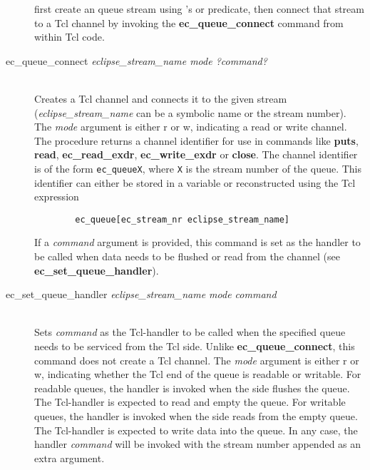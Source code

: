 \begin{description}
first create an {\eclipse} queue stream using {\eclipse}'s
or
predicate, then connect that stream to a Tcl channel by invoking
the {\bf ec_queue_connect} command from within Tcl code.

\item[\index{ec_queue_connect (Tcl embedding interface)}ec_queue_connect {\it eclipse_stream_name mode ?command?}]\ \\
        Creates a Tcl channel and connects it to the given {\eclipse}
        stream ({\it eclipse_stream_name} can be a symbolic name or the
        {\eclipse} stream number).
        The {\it mode} argument is either r or w, indicating a read or write channel.
        The procedure returns a channel identifier for use in commands
        like {\bf puts}, {\bf read}, {\bf ec_read_exdr},
        {\bf ec_write_exdr} or {\bf close}.
        The channel identifier is of the form {\tt ec_queueX}, where {\tt X}
        is the {\eclipse} stream number of the queue.
        This identifier can either be stored in a variable or reconstructed
        using the Tcl expression
        \begin{verbatim}
        ec_queue[ec_stream_nr eclipse_stream_name]
        \end{verbatim}
	If a {\it command} argument is provided, this command is set as the
	handler to be called when data needs to be flushed or read from
	the channel (see {\bf ec_set_queue_handler}).

\item[\index{ec_set_queue_handler (Tcl embedding interface)}ec_set_queue_handler {\it eclipse_stream_name mode command}]\ \\
	Sets {\it command} as the Tcl-handler to be called when the
	specified queue needs to be serviced from the Tcl side.
	Unlike {\bf ec_queue_connect}, this command does not create
	a Tcl channel.
	The {\it mode} argument is either r or w, indicating whether
	the Tcl end of the queue is readable or writable.
	For readable queues, the handler is invoked when the
	{\eclipse} side flushes the queue.  The Tcl-handler is
	expected to read and empty the queue.
	For writable queues, the handler is invoked when the
	{\eclipse} side reads from the empty queue. The Tcl-handler is
	expected to write data into the queue.
	In any case, the handler {\it command} will be invoked with
	the {\eclipse} stream number appended as an extra argument.

\end{description}


